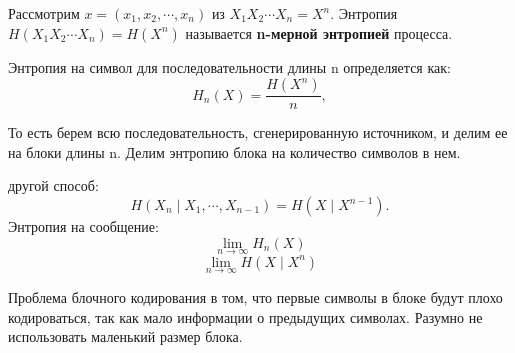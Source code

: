 Рассмотрим $x = (x_1, x_2, \cdots, x_n)$ из $X_1 X_2 \cdots X_n = X^n$.
Энтропия $H(X_1 X_2 \cdots X_n) = H(X^n)$ называется \textbf{n-мерной
энтропией} процесса.

Энтропия на символ для последовательности длины n определяется как:
\[
    H_n(X) = \frac{H(X^n)}{n},
\]

То есть берем всю последовательность, сгенерированную источником, и делим ее на
блоки длины n. Делим энтропию блока на количество символов в нем.

другой способ:
\[
    H(X_n \mid X_1, \cdots, X_{n-1}) = H(X \mid X^{n-1}).
\]
Энтропия на сообщение:
\[
    \lim_{n \to \infty} H_n(X)
\]
\[
    \lim_{n \to \infty} H(X \mid X^n)
\]

Проблема блочного кодирования в том, что первые символы в блоке будут плохо
кодироваться, так как мало информации о предыдущих символах. Разумно не
использовать маленький размер блока.

